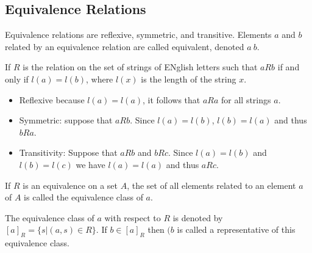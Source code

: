 \subsection{Equivalence Relations}
Equivalence relations are reflexive, symmetric, and transitive. Elements \(a\) and \(b\) related by an equivalence relation are called equivalent, denoted \(a ~ b\).

\begin{example}
    If \(R\) is the relation on the set of strings of ENglish letters such that \(a R b\) if and only if \(l(a) = l(b)\), where \(l(x)\) is the length of the string \(x\).
    \begin{itemize}
        \item Reflexive because \(l(a) = l(a)\), it follows that \(a R a\) for all strings \(a\).
        \item Symmetric: suppose that \(a R b\). Since \(l(a) = l(b)\), \(l(b) = l(a)\) and thus \(b R a\).
        \item Transitivity: Suppose that \(a R b\) and \(b R c\). Since \(l(a) = l(b)\) and
              \(l(b) = l(c)\) we have \(l(a) = l(a)\) and thus \(a R c\).
    \end{itemize}
\end{example}
If \(R\) is an equivalence on a set \(A\), the set of all elements related to an element \(a\) of \(A\) is called the equivalence class of \(a\).

The equivalence class of \(a\) with respect to \(R\) is denoted by \([a]_R = \{s | (a, s) \in R\}\). If \(b \in [a]_R\) then \((b\) is called a representative of this equivalence class.

